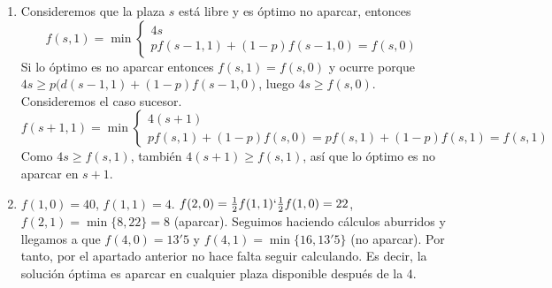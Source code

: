 \documentclass[twoside]{article}
\begin{document}
\begin{ejercicio}{1}
\begin{solucion}
\begin{enumerate}
\item Consideremos que la plaza $s$ está libre y es óptimo no aparcar, entonces
$$f(s,1)=\min\begin{cases}
4s\\
pf(s-1,1)+(1-p)f(s-1,0)=f(s,0)
\end{cases}$$
Si lo óptimo es no aparcar entonces $f(s,1)=f(s,0)$ y ocurre porque $4s\geq p(d(s-1,1)+(1-p)f(s-1,0)$, luego $4s\geq f(s,0)$. Consideremos el caso sucesor. 
$$f(s+1,1)=\min\begin{cases}
4(s+1)\\
pf(s,1)+(1-p)f(s,0)=pf(s,1)+(1-p)f(s,1)=f(s,1)
\end{cases}$$
Como $4s\geq f(s,1)$, también $4(s+1)\geq f(s,1)$, así que lo óptimo es no aparcar en $s+1$. 

\item $f(1,0)=40$, $f(1,1)=4$. $f(2,0)=\frac{1}{2}f(1,1)`\frac{1}{2}f(1,0)=22$, $f(2,1)=\min\{8, 22\}=8$ (aparcar). Seguimos haciendo cálculos aburridos y llegamos a que $f(4,0)=13'5$ y $f(4,1)=\min\{16,13'5\}$ (no aparcar). Por tanto, por el apartado anterior no hace falta seguir calculando. Es decir, la solución óptima es aparcar en cualquier plaza disponible después de la 4.


\end{enumerate}
\end{solucion}
\end{ejercicio}
\end{document}
